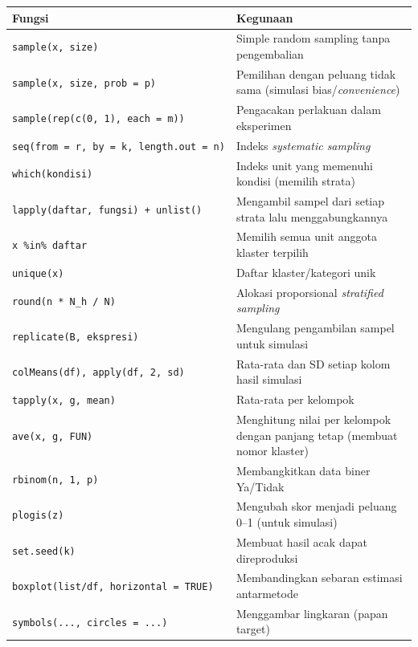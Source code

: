 \documentclass[
  indonesian,
  letterpaper,
]{book}
\newcounter{none} %
\begin{document}
{\def\LTcaptype{none} %
\begin{longtable}[]{@{}
  >{\raggedright\arraybackslash}p{}
  >{\raggedright\arraybackslash}p{}@{}}
\toprule\noalign{}
\begin{minipage}[b]{\linewidth}\raggedright
Fungsi
\end{minipage} & \begin{minipage}[b]{\linewidth}\raggedright
Kegunaan
\end{minipage} \\
\midrule\noalign{}
\endhead
\bottomrule\noalign{}
\endlastfoot
\texttt{sample(x,\ size)} & Simple random sampling tanpa pengembalian \\
\texttt{sample(x,\ size,\ prob\ =\ p)} & Pemilihan dengan peluang tidak
sama (simulasi bias/\emph{convenience}) \\
\texttt{sample(rep(c(0,\ 1),\ each\ =\ m))} & Pengacakan perlakuan dalam
eksperimen \\
\texttt{seq(from\ =\ r,\ by\ =\ k,\ length.out\ =\ n)} & Indeks
\emph{systematic sampling} \\
\texttt{which(kondisi)} & Indeks unit yang memenuhi kondisi (memilih
strata) \\
\texttt{lapply(daftar,\ fungsi)\ +\ unlist()} & Mengambil sampel dari
setiap strata lalu menggabungkannya \\
\texttt{x\ \%in\%\ daftar} & Memilih semua unit anggota klaster
terpilih \\
\texttt{unique(x)} & Daftar klaster/kategori unik \\
\texttt{round(n\ *\ N\_h\ /\ N)} & Alokasi proporsional \emph{stratified
sampling} \\
\texttt{replicate(B,\ ekspresi)} & Mengulang pengambilan sampel untuk
simulasi \\
\texttt{colMeans(df),\ apply(df,\ 2,\ sd)} & Rata-rata dan SD setiap
kolom hasil simulasi \\
\texttt{tapply(x,\ g,\ mean)} & Rata-rata per kelompok \\
\texttt{ave(x,\ g,\ FUN)} & Menghitung nilai per kelompok dengan panjang
tetap (membuat nomor klaster) \\
\texttt{rbinom(n,\ 1,\ p)} & Membangkitkan data biner Ya/Tidak \\
\texttt{plogis(z)} & Mengubah skor menjadi peluang 0--1 (untuk
simulasi) \\
\texttt{set.seed(k)} & Membuat hasil acak dapat direproduksi \\
\texttt{boxplot(list/df,\ horizontal\ =\ TRUE)} & Membandingkan sebaran
estimasi antarmetode \\
\texttt{symbols(...,\ circles\ =\ ...)} & Menggambar lingkaran (papan
target) \\
\end{longtable}
}
\end{document}
